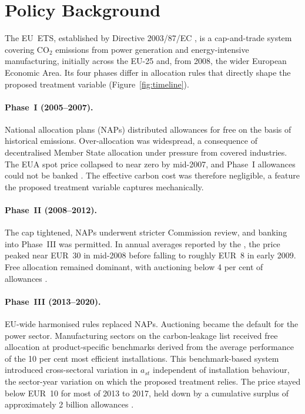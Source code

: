 \section{Policy Background}
\label{sec:policy}

The EU~ETS, established by Directive 2003/87/EC \citep{directive2003}, is a cap-and-trade system covering CO$_2$ emissions from power generation and energy-intensive manufacturing, initially across the EU-25 and, from 2008, the wider European Economic Area. Its four phases differ in allocation rules that directly shape the proposed treatment variable (Figure~\ref{fig:timeline}).

\paragraph{Phase~I (2005--2007).}
National allocation plans (NAPs) distributed allowances for free on the basis of historical emissions. Over-allocation was widespread, a consequence of decentralised Member State allocation under pressure from covered industries. The EUA spot price collapsed to near zero by mid-2007, and Phase~I allowances could not be banked \citep{ellerman2016}. The effective carbon cost was therefore negligible, a feature the proposed treatment variable captures mechanically.

\paragraph{Phase~II (2008--2012).}
The cap tightened, NAPs underwent stricter Commission review, and banking into Phase~III was permitted. In annual averages reported by the \citet{eeaprice}, the price peaked near EUR~30 in mid-2008 before falling to roughly EUR~8 in early 2009. Free allocation remained dominant, with auctioning below 4 per cent of allowances \citep{ellerman2016}.

\paragraph{Phase~III (2013--2020).}
EU-wide harmonised rules replaced NAPs. Auctioning became the default for the power sector. Manufacturing sectors on the carbon-leakage list received free allocation at product-specific benchmarks derived from the average performance of the 10 per cent most efficient installations. This benchmark-based system introduced cross-sectoral variation in $a_{st}$ independent of installation behaviour, the sector-year variation on which the proposed treatment relies. The price stayed below EUR~10 for most of 2013 to 2017, held down by a cumulative surplus of approximately 2 billion allowances \citep{eutl}.

